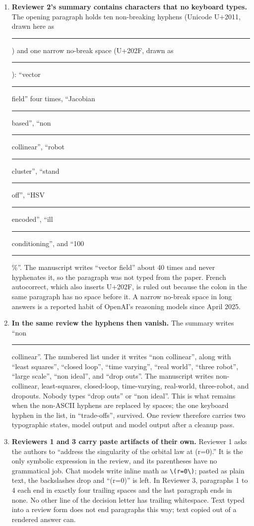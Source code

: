 \documentclass[11pt,letterpaper]{article}
\newcommand{\nbh}{\textcolor{accent}{\rule[0.45ex]{0.42em}{0.9pt}}}
\newcommand{\nnbsp}{\textcolor{accent}{\rule[-0.3ex]{0.9pt}{1.6ex}}}
\newcommand{\q}[1]{``#1''}
\newcommand{\head}[1]{\vspace{6pt}{\sffamily\bfseries\small\textcolor{accent}{\MakeUppercase{#1}}}\par\vspace{1pt}{\color{rule}\hrule height 0.6pt}\vspace{4pt}}
\newcommand{\lead}[1]{\textbf{#1}}
\begin{document}
\head{The text was pasted from a model}
\begin{enumerate}

\item \lead{Reviewer 2's summary contains characters that no keyboard types.} The opening paragraph holds ten non-breaking hyphens (Unicode U+2011, drawn here as \nbh) and one narrow no-break space (U+202F, drawn as \nnbsp): \q{vector\nbh field} four times, \q{Jacobian\nbh based}, \q{non\nbh collinear}, \q{robot\nbh cluster}, \q{stand\nbh off}, \q{HSV\nbh encoded}, \q{ill\nbh conditioning}, and \q{100\nnbsp\%}. The manuscript writes \q{vector field} about 40 times and never hyphenates it, so the paragraph was not typed from the paper. French autocorrect, which also inserts U+202F, is ruled out because the colon in the same paragraph has no space before it. A narrow no-break space in long answers is a reported habit of OpenAI's reasoning models since April 2025.

\item \lead{In the same review the hyphens then vanish.} The summary writes \q{non\nbh collinear}. The numbered list under it writes \q{non collinear}, along with \q{least squares}, \q{closed loop}, \q{time varying}, \q{real world}, \q{three robot}, \q{large scale}, \q{non ideal}, and \q{drop outs}. The manuscript writes non-collinear, least-squares, closed-loop, time-varying, real-world, three-robot, and dropouts. Nobody types \q{drop outs} or \q{non ideal}. This is what remains when the non-ASCII hyphens are replaced by spaces; the one keyboard hyphen in the list, in \q{trade-offs}, survived. One review therefore carries two typographic states, model output and model output after a cleanup pass.

\item \lead{Reviewers 1 and 3 carry paste artifacts of their own.} Reviewer 1 asks the authors to \q{address the singularity of the orbital law at (r=0).} It is the only symbolic expression in the review, and its parentheses have no grammatical job. Chat models write inline math as \texttt{\textbackslash(r=0\textbackslash)}; pasted as plain text, the backslashes drop and \q{(r=0)} is left. In Reviewer 3, paragraphs 1 to 4 each end in exactly four trailing spaces and the last paragraph ends in none. No other line of the decision letter has trailing whitespace. Text typed into a review form does not end paragraphs this way; text copied out of a rendered answer can.

\end{enumerate}
\end{document}
